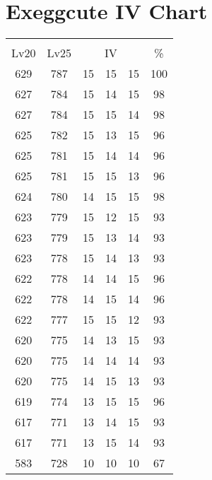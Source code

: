 \documentclass{article}%
\begin{document}
%
\normalsize%
\section{Exeggcute IV Chart}%
\label{sec:Exeggcute IV Chart}%
\renewcommand{\arraystretch}{1.5}%
\begin{tabular}{|c|c|c|c|c|c|}%
\hline%
\multicolumn{6}{|c|}{\textcolor{white}{ 
\linebreak{Exeggcute}
}%
\cellcolor{black}}\\%
\multicolumn{1}{|c}{Lv20}&\multicolumn{1}{c|}{Lv25}&\multicolumn{3}{c|}{IV}&\multicolumn{1}{|c|}{\%}\\%
\hline%
\rowcolor{color100}%
629&787&15&15&15&100\\%
\hline%
\rowcolor{color98}%
627&784&15&14&15&98\\%
\hline%
\rowcolor{color98}%
627&784&15&15&14&98\\%
\hline%
\rowcolor{color96}%
625&782&15&13&15&96\\%
\hline%
\rowcolor{color96}%
625&781&15&14&14&96\\%
\hline%
\rowcolor{color96}%
625&781&15&15&13&96\\%
\hline%
\rowcolor{color98}%
624&780&14&15&15&98\\%
\hline%
\rowcolor{color93}%
623&779&15&12&15&93\\%
\hline%
\rowcolor{color93}%
623&779&15&13&14&93\\%
\hline%
\rowcolor{color93}%
623&778&15&14&13&93\\%
\hline%
\rowcolor{color96}%
622&778&14&14&15&96\\%
\hline%
\rowcolor{color96}%
622&778&14&15&14&96\\%
\hline%
\rowcolor{color93}%
622&777&15&15&12&93\\%
\hline%
\rowcolor{color93}%
620&775&14&13&15&93\\%
\hline%
\rowcolor{color93}%
620&775&14&14&14&93\\%
\hline%
\rowcolor{color93}%
620&775&14&15&13&93\\%
\hline%
\rowcolor{color96}%
619&774&13&15&15&96\\%
\hline%
\rowcolor{color93}%
617&771&13&14&15&93\\%
\hline%
\rowcolor{color93}%
617&771&13&15&14&93\\%
\hline%
\rowcolor{color91}%
583&728&10&10&10&67\\%
\end{tabular}

%
\end{document}

